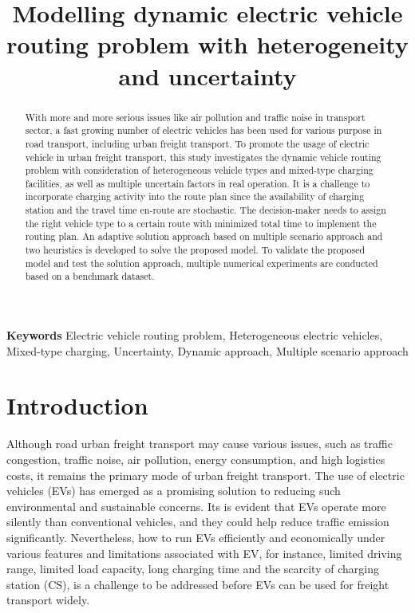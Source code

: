 \documentclass[11pt]{article}
\title{Modelling dynamic electric vehicle routing problem with heterogeneity and uncertainty}
\author{ }
\date{}
\begin{document}

\maketitle

\begin{abstract}
	With more and more serious issues like air pollution and traffic noise in transport sector, a fast growing number of electric vehicles has been used for various purpose in road transport, including urban freight transport. To promote the usage of electric vehicle in urban freight transport, this study investigates the dynamic vehicle routing problem with consideration of heterogeneous vehicle types and mixed-type charging facilities, as well as multiple uncertain factors in real operation. It is a challenge to incorporate charging activity into the route plan since the availability of charging station and the travel time en-route are stochastic. The decision-maker needs to assign the right vehicle type to a certain route with minimized total time to implement the routing plan. An adaptive solution approach based on multiple scenario approach and two heuristics is developed to solve the proposed model. To validate the proposed model and test the solution approach, multiple numerical experiments are conducted based on a benchmark dataset.
\end{abstract}
\textbf{Keywords} Electric vehicle routing problem, Heterogeneous electric vehicles, Mixed-type charging, Uncertainty, Dynamic approach, Multiple scenario approach


\section{Introduction}

Although road urban freight transport may cause various issues, such as traffic congestion, traffic noise, air pollution, energy consumption, and high logistics costs, it remains the primary mode of urban freight transport. The use of electric vehicles (EVs) has emerged as a promising solution to reducing such environmental and sustainable concerns. Its is evident that EVs operate more silently than conventional vehicles, and they could help reduce traffic emission significantly.  Nevertheless, how to run EVs efficiently and economically under various features and limitations associated with EV, for instance, limited driving range, limited load capacity, long charging time and the scarcity of charging station (CS), is a challenge to be addressed before EVs can be used for freight transport widely.
\end{document}
